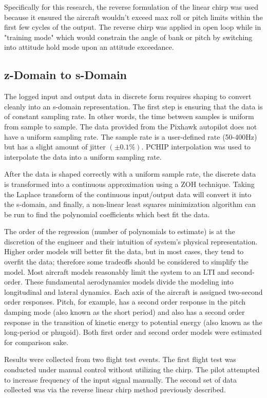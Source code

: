 Specifically for this research, the reverse formulation of the linear chirp was used because it ensured the aircraft wouldn't exceed max roll or pitch limits within the first few cycles of the output.  The reverse chirp was applied in open loop while in "training mode"  which would constrain the angle of bank or pitch by switching into attitude hold mode upon an attitude exceedance.

\subsection{z-Domain to s-Domain}
The logged input and output data in discrete form requires shaping to convert cleanly into an s-domain representation.  The first step is ensuring that the data is of constant sampling rate.  In other words, the time between samples is uniform from sample to sample.  The data provided from the Pixhawk autopilot does not have a uniform sampling rate.  The sample rate is a user-defined rate (50-400Hz) but has a slight amount of jitter $(\pm 0.1\%)$.  \ac{PCHIP} interpolation was used to interpolate the data into a uniform sampling rate.

After the data is shaped correctly with a uniform sample rate, the discrete data is transformed into a continuous approximation using a \ac{ZOH} technique.  Taking the Laplace transform of the continuous input/output data will convert it into the s-domain, and finally, a non-linear least squares minimization algorithm can be run to find the polynomial coefficients which best fit the data.

The order of the regression (number of polynomials to estimate) is at the discretion of the engineer and their intuition of system's physical representation.  Higher order models will better fit the data, but in most cases, they tend to overfit the data; therefore some tradeoffs should be considered to simplify the model.  Most aircraft models reasonably limit the system to an \ac{LTI} and second-order.  These fundamental aerodynamics models divide the modeling into longitudinal and lateral dynamics.  Each axis of the aircraft is assigned two-second order responses.  Pitch, for example, has a second order response in the pitch damping mode (also known as the short period) and also has a second order response in the transition of kinetic energy to potential energy (also known as the long-period or phugoid).  Both first order and second order models were estimated for comparison sake.

Results were collected from two flight test events.  The first flight test was conducted under manual control without utilizing the chirp.  The pilot attempted to increase frequency of the input signal manually.  The second set of data collected was via the reverse linear chirp method previously described.  

